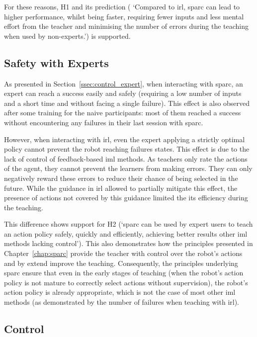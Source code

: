 For these reasons, H1 and its prediction ( `Compared to \gls{irl}, \gls{sparc} can lead to higher performance, whilst being faster, requiring fewer inputs and less mental effort from the teacher and minimising the number of errors during the teaching when used by non-experts.') is supported.

\subsection{Safety with Experts}

As presented in Section~\ref{ssec:control_expert}, when interacting with \gls{sparc}, an expert can reach a success easily and safely (requiring a low number of inputs and a short time and without facing a single failure). This effect is also observed after some training for the naive participants: most of them reached a success without encountering any failures in their last session with \gls{sparc}.

However, when interacting with \gls{irl}, even the expert applying a strictly optimal policy cannot prevent the robot reaching failures states. This effect is due to the lack of control of feedback-based \gls{iml} methods. As teachers only rate the actions of the agent, they cannot prevent the learners from making errors. They can only negatively reward these errors to reduce their chance of being selected in the future. While the guidance in \gls{irl} allowed to partially mitigate this effect, the presence of actions not covered by this guidance limited the its efficiency during the teaching.

This difference shows support for H2 (`\gls{sparc} can be used by expert users to teach an action policy safely, quickly and efficiently, achieving better results other \gls{iml} methods lacking control'). This also demonstrates how the principles presented in Chapter~\ref{chap:sparc} provide the teacher with control over the robot's actions and by extend improve the teaching. Consequently, the principles underlying \gls{sparc} ensure that even in the early stages of teaching (when the robot's action policy is not mature to correctly select actions without supervision), the robot's action policy is already appropriate, which is not the case of most other \gls{iml} methods (as demonstrated by the number of failures when teaching with \gls{irl}).

\subsection{Control}
\label{ssec:control_control}

